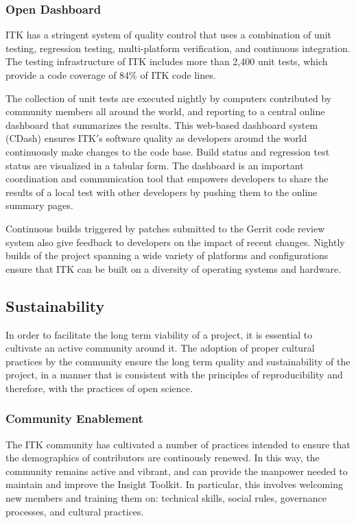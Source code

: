 \documentclass{frontiersENG} %
\begin{document}
\subsubsection{Open Dashboard}

ITK has a stringent system of quality control
that uses a combination of unit testing, regression testing, multi-platform
verification, and continuous integration. The testing infrastructure of ITK
includes more than 2,400 unit tests, which provide a code coverage of 84\% of
ITK code lines.

The collection of unit tests are executed nightly by computers contributed by
community members all around the world, and reporting to a central online
dashboard that summarizes the results. This web-based dashboard system (CDash)
 \cite{ITKDashboard} ensures ITK$'$s software quality as developers around the
world continuously make changes to the code base. Build status and regression
test status are visualized in a tabular form. The dashboard is an important
coordination and communication tool that empowers developers to share the
results of a local test with other developers by pushing them to the online
summary pages.

Continuous builds triggered by patches submitted to the Gerrit code review
system also give feedback to developers on the impact of recent changes.
Nightly builds of the project spanning a wide variety of platforms and
configurations ensure that ITK can be built on a diversity of operating systems
and hardware.


\subsection{Sustainability}

In order to facilitate the long term viability of a project, it is essential to
cultivate an active community around it. The adoption of proper cultural
practices by the community ensure the long term quality and sustainability of
the project, in a manner that is consistent with the principles of
reproducibility and therefore, with the practices of open science.

\subsubsection{Community Enablement}

The ITK community has cultivated a number of practices intended to ensure that
the demographics of contributors are continously renewed. In this way, the
community remains active and vibrant, and can provide the manpower needed to
maintain and improve the Insight Toolkit. In particular, this involves welcoming
new members and training them on:  technical skills, social rules, governance
processes, and cultural practices.
\end{document}
